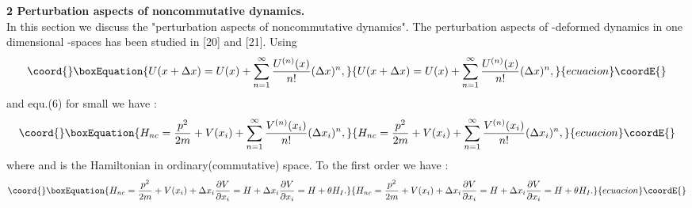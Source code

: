 \documentclass[a4paper,a4paper]{article}
\begin{document}
\textbf{2 Perturbation aspects of noncommutative dynamics. }\\

In this section we discuss the "perturbation aspects of
noncommutative dynamics". The perturbation aspects of \coordHE{}-deformed
dynamics in one dimensional \coordHE{}-spaces has been studied in [20]
and [21]. Using
\begin{equation}\coord{}\boxEquation{
U(x+\Delta x)=U(x)+\sum_{n=1}^{\infty}  \frac{U^{(n)}(x)}{n!} (\Delta x)^{n}
,
}{
U(x+\Delta x)=U(x)+\sum_{n=1}^{\infty}  \frac{U^{(n)}(x)}{n!} (\Delta x)^{n}
,
}{ecuacion}\coordE{}\end{equation}
and equ.(6) for small \myHighlight{$\theta$}\coordHE{} we have :
\begin{equation}\coord{}\boxEquation{
H_{nc}=\frac{p^{2}}{2m}+V(x_{i})+\sum_{n=1}^{\infty}
\frac{V^{(n)}(x_{i})}{n!} (\Delta x_{i})^{n} ,
}{
H_{nc}=\frac{p^{2}}{2m}+V(x_{i})+\sum_{n=1}^{\infty}
\frac{V^{(n)}(x_{i})}{n!} (\Delta x_{i})^{n} ,
}{ecuacion}\coordE{}\end{equation}
where \coordHE{} and
\coordHE{} is the Hamiltonian in ordinary(commutative) space.
To the first order we have :
\begin{equation}\coord{}\boxEquation{
H_{nc}=\frac{p^{2}}{2m}+V(x_{i})+\Delta x_{i} \frac{\partial
V}{\partial x_{i}}=H+\Delta x_{i}\frac{\partial
V}{\partial x_{i}}=H+\theta H_{I} .
}{
H_{nc}=\frac{p^{2}}{2m}+V(x_{i})+\Delta x_{i} \frac{\partial
V}{\partial x_{i}}=H+\Delta x_{i}\frac{\partial
V}{\partial x_{i}}=H+\theta H_{I} .
}{ecuacion}\coordE{}\end{equation}
\end{document}

